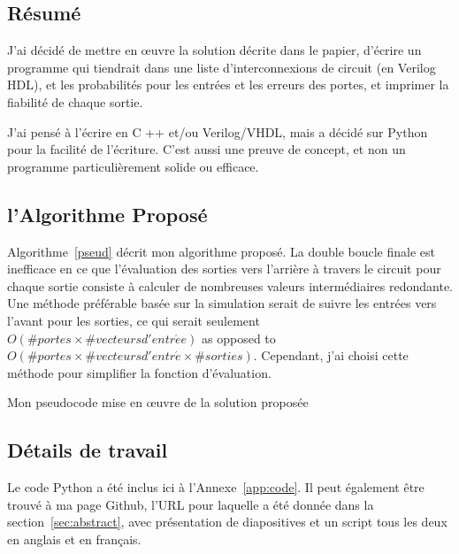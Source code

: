 \documentclass{article}
\begin{document}
\subsection{Résumé}
J'ai décidé de mettre en œuvre la solution décrite dans le papier, d'écrire un programme qui tiendrait dans une liste d'interconnexions de circuit (en Verilog HDL), et les probabilités pour les entrées et les erreurs des portes, et imprimer la fiabilité de chaque sortie.

J'ai pensé à l'écrire en C ++ et/ou Verilog/VHDL, mais a décidé sur Python pour la facilité de l'écriture. C'est aussi une preuve de concept, et non un programme particulièrement  solide ou efficace.

\subsection{l'Algorithme Proposé}
Algorithme~\ref{pseud} décrit mon algorithme proposé. La double boucle finale est inefficace en ce que l'évaluation des sorties vers l'arrière à travers le circuit pour chaque sortie consiste à calculer de nombreuses valeurs intermédiaires redondante. Une méthode préférable basée sur la simulation serait de suivre les entrées vers l'avant pour les sorties, ce qui serait seulement $O(\#portes \times \#vecteurs d'entr\acute{e}e)$ as opposed to $O(\#portes \times \#vecteurs d'entr\acute{e} \times \#sorties)$. Cependant, j'ai choisi cette méthode pour simplifier la fonction d'évaluation.

\begin{algorithm}[hp]
\caption{Mon pseudocode mise en œuvre de la solution proposée}
\label{pseud}
\end{algorithm}

\subsection{Détails de travail}
Le code Python a été inclus ici à l'Annexe~\ref{app:code}. Il peut également être trouvé à ma page Github, l'URL pour laquelle a été donnée dans la section~\ref{sec:abstract}, avec présentation de diapositives et un script tous les deux en anglais et en français.
\end{document}

